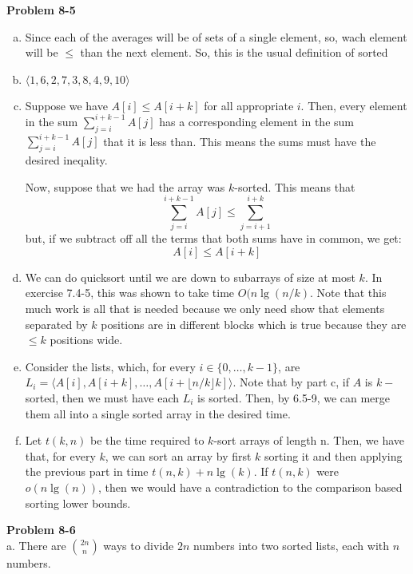 \documentclass{article}
\begin{document}
\noindent\textbf{Problem 8-5}\\
\begin{enumerate}[a.]
\item
Since each of the averages will be of sets of a single element, so, wach element will be $\le$ than the next element. So, this is the usual definition of sorted
\item
$\langle 1,6,2,7,3,8,4,9,10\rangle$
\item
Suppose we have $A[i] \le A[i+k]$ for all appropriate $i$. Then, every element in the sum $\sum_{j=i}^{i+k-1} A[j]$ has a corresponding element in the sum $\sum_{j=i}^{i+k-1} A[j]$ that it is less than. This means the sums must have the desired ineqality.

Now, suppose that we had the array was $k$-sorted. This means that 
\[
\sum_{j=i}^{i+k-1} A[j] \le \sum_{j=i+1}^{i+k}
\] 
but, if we subtract off all the terms that both sums have in common, we get:
\[
A[i] \le A[i+k]
\]

\item
We can do quicksort until we are down to subarrays of size at most $k$. In exercise 7.4-5, this was shown to take time $O(n\lg(n/k)$. Note that this much work is all that is needed because we only need show that elements separated by $k$ positions are in different blocks which is true because they are $\le k$ positions wide.

\item
Consider the lists, which, for every $i\in\{0,\ldots,k-1\}$, are $L_i = \langle A[i],A[i+k], \ldots,A[i+ \lfloor n/k \rfloor k]\rangle$. Note that by  part c, if $A$ is $k-$ sorted, then we must have each $L_i$ is sorted. Then, by 6.5-9, we can merge them all into a single sorted array in the desired time.

\item
Let $t(k,n)$ be the time required to $k$-sort arrays of length n. Then, we have that, for every $k$, we can sort an array by first $k$ sorting it and then applying the previous part in time $t(n,k) +n \lg(k)$. If $t(n,k)$ were $o(n\lg(n))$, then we would have a contradiction to the comparison based sorting lower bounds.

\end{enumerate}



\noindent\textbf{Problem 8-6}\\

a. There are ${2n \choose n}$ ways to divide $2n$ numbers into two sorted lists, each with $n$ numbers.\\
\end{document}
